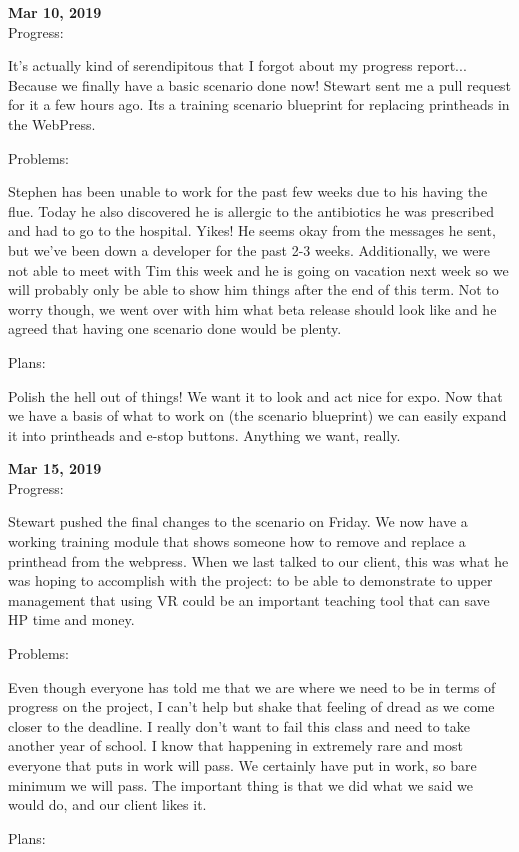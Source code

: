 \textbf{Mar 10, 2019}\\
Progress:

It's actually kind of serendipitous that I forgot about my progress report... Because we finally have a basic scenario done now! Stewart sent me a pull request for it a few hours ago. Its a training scenario blueprint for replacing printheads in the WebPress.

Problems:

Stephen has been unable to work for the past few weeks due to his having the flue. Today he also discovered he is allergic to the antibiotics he was prescribed and had to go to the hospital. Yikes! He seems okay from the messages he sent, but we've been down a developer for the past 2-3 weeks. Additionally, we were not able to meet with Tim this week and he is going on vacation next week so we will probably only be able to show him things after the end of this term. Not to worry though, we went over with him what beta release should look like and he agreed that having one scenario done would be plenty.

Plans:

Polish the hell out of things! We want it to look and act nice for expo. Now that we have a basis of what to work on (the scenario blueprint) we can easily expand it into printheads and e-stop buttons. Anything we want, really.

\textbf{Mar 15, 2019}\\
Progress:

Stewart pushed the final changes to the scenario on Friday. We now have a working training module that shows someone how to remove and replace a printhead from the webpress. When we last talked to our client, this was what he was hoping to accomplish with the project: to be able to demonstrate to upper management that using VR could be an important teaching tool that can save HP time and money.

Problems:

Even though everyone has told me that we are where we need to be in terms of progress on the project, I can't help but shake that feeling of dread as we come closer to the deadline. I really don't want to fail this class and need to take another year of school. I know that happening in extremely rare and most everyone that puts in work will pass. We certainly have put in work, so bare minimum we will pass. The important thing is that we did what we said we would do, and our client likes it.

Plans:

